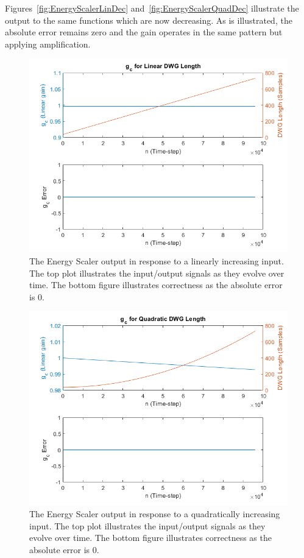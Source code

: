 \documentclass[../main.tex]{subfiles}
\begin{document}
Figures~\ref{fig:EnergyScalerLinDec} and~\ref{fig:EnergyScalerQuadDec} illustrate the output to the same functions which are now decreasing. As is illustrated, the absolute error remains zero and the gain operates in the same pattern but applying amplification.

\begin{figure}[h!]
    \centering
    \includegraphics[scale=.45]{./images/plots/EnergyScalerLinearIncreasing.png}
    \caption{The Energy Scaler output in response to a linearly increasing input. The top plot illustrates the input/output signals as they evolve over time. The bottom figure illustrates correctness as the absolute error is 0.}
    \label{fig:EnergyScalerLinInc}
\end{figure}

\begin{figure}[h!]
    \centering
    \includegraphics[scale=.45]{./images/plots/EnergyScalerQuadraticIncreasing.png}
    \caption{The Energy Scaler output in response to a quadratically increasing input. The top plot illustrates the input/output signals as they evolve over time. The bottom figure illustrates correctness as the absolute error is 0.}
    \label{fig:EnergyScalerQuadInc}
\end{figure}
\end{document}
